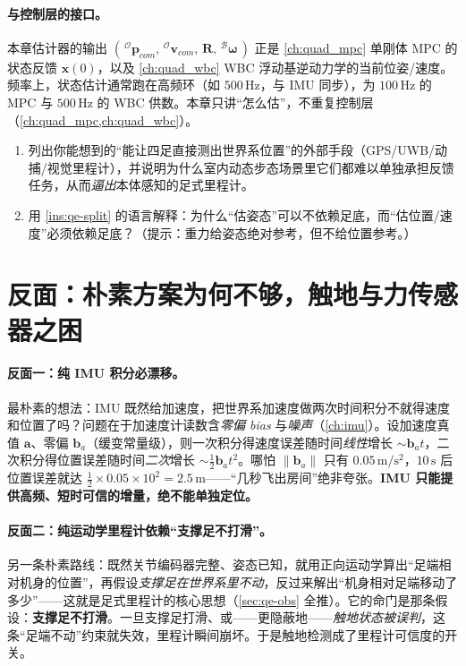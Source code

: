\paragraph{与控制层的接口。}
本章估计器的输出 $(\,{}^{\mathcal{O}}\boldsymbol{p}_{com},\,{}^{\mathcal{O}}\boldsymbol{v}_{com},\,\mathbf{R},\,{}^{\mathcal{B}}\boldsymbol{\omega}\,)$ 正是 \cref{ch:quad_mpc} 单刚体 MPC 的状态反馈 $\boldsymbol{x}(0)$，以及 \cref{ch:quad_wbc} WBC 浮动基逆动力学的当前位姿/速度。频率上，状态估计通常跑在高频环（如 $500\,\mathrm{Hz}$，与 IMU 同步），为 $100\,\mathrm{Hz}$ 的 MPC 与 $500\,\mathrm{Hz}$ 的 WBC 供数。本章只讲“怎么估”，不重复控制层（\cref{ch:quad_mpc,ch:quad_wbc}）。

\begin{practice}
\begin{enumerate}
  \item 列出你能想到的“能让四足直接测出世界系位置”的外部手段（GPS/UWB/动捕/视觉里程计），并说明为什么室内动态步态场景里它们都难以单独承担反馈任务，从而\emph{逼出}本体感知的足式里程计。
  \item 用 \cref{ins:qe-split} 的语言解释：为什么“估姿态”可以不依赖足底，而“估位置/速度”必须依赖足底？（提示：重力给姿态绝对参考，但不给位置参考。）
\end{enumerate}
\end{practice}

\section{反面：朴素方案为何不够，触地与力传感器之困}
\label{sec:qe-naive}

\paragraph{反面一：纯 IMU 积分必漂移。}
最朴素的想法：IMU 既然给加速度，把世界系加速度做两次时间积分不就得速度和位置了吗？问题在于加速度计读数含\emph{零偏 bias} 与\emph{噪声}（\cref{ch:imu}）。设加速度真值 $\boldsymbol{a}$、零偏 $\boldsymbol{b}_a$（缓变常量级），则一次积分得速度误差随时间\emph{线性}增长 $\sim\!\boldsymbol{b}_a t$，二次积分得位置误差随时间\emph{二次}增长 $\sim\!\tfrac12\boldsymbol{b}_a t^2$。哪怕 $\|\boldsymbol{b}_a\|$ 只有 $0.05\,\mathrm{m/s^2}$，$10\,\mathrm{s}$ 后位置误差就达 $\tfrac12\times0.05\times10^2=2.5\,\mathrm{m}$——“几秒飞出房间”绝非夸张。\textbf{IMU 只能提供高频、短时可信的增量，绝不能单独定位。}

\paragraph{反面二：纯运动学里程计依赖“支撑足不打滑”。}
另一条朴素路线：既然关节编码器完整、姿态已知，就用正向运动学算出“足端相对机身的位置”，再假设\emph{支撑足在世界系里不动}，反过来解出“机身相对足端移动了多少”——这就是足式里程计的核心思想（\cref{sec:qe-obs} 全推）。它的命门是那条假设：\textbf{支撑足不打滑}。一旦支撑足打滑、或——更隐蔽地——\emph{触地状态被误判}，这条“足端不动”约束就失效，里程计瞬间崩坏。于是触地检测成了里程计可信度的开关。

